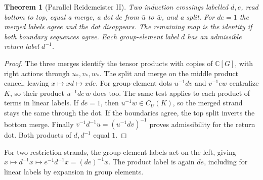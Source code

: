 \documentclass[11pt,a4paper]{article}
\numberwithin{equation}{section}
\newtheorem{theorem}{Theorem}[section]
\theoremstyle{definition}
\newcommand{\C}{\mathbb C}
\begin{document}
\begin{center}
\end{center}

\begin{theorem}[Parallel Reidemeister II]\label{thm:r2-parallel}
Two induction crossings labelled \(d,e\), read bottom to top, equal
a merge, a dot \(de\) from \(\bar u\) to \(\bar w\), and a split.
For \(de=1\) the merged labels agree and the dot disappears.
The remaining map is the identity if both boundary sequences agree.
Each group-element label \(d\) has an admissible return label \(d^{-1}\).
\end{theorem}

\begin{proof}
The three merges identify the tensor products with copies of
\(\C[G]\), with right actions through \(u_*,v_*,w_*\).
The split and merge on the middle product cancel, leaving
\(x\mapsto xd\mapsto xde\).
For group-element dots \(u^{-1}dv\) and \(v^{-1}ew\) centralize
\(K\), so their product \(u^{-1}de\,w\) does too. The same test
applies to each product of terms in linear labels.
If \(de=1\), then \(u^{-1}w\in C_U(K)\), so the merged strand
stays the same through the dot. If the boundaries agree, the
top split inverts the bottom merge.
Finally \(v^{-1}d^{-1}u=(u^{-1}dv)^{-1}\) proves admissibility
for the return dot. Both products of \(d,d^{-1}\) equal \(1\).
\end{proof}

For two restriction strands, the group-element labels act on the
left, giving \(x\mapsto d^{-1}x\mapsto e^{-1}d^{-1}x=(de)^{-1}x\).
The product label is again \(de\), including for linear labels by
expansion in group elements.
\end{document}
